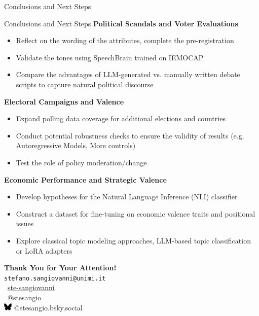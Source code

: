 \documentclass[9pt, aspectratio=169]{beamer}
\newcommand{\customcite}[1]{\textcolor{blue}{\footnotesize\parencite{#1}}}
\begin{document}
\begin{section}{Conclusions and Next Steps}
\begin{frame}{Conclusions and Next Steps}
    \textbf{Political Scandals and Voter Evaluations}
    \begin{itemize}
        \item Reflect on the wording of the attributes, complete the pre-registration
        \item Validate the tones using SpeechBrain \customcite{speechbrain} trained on IEMOCAP
        \item Compare the advantages of LLM-generated vs. manually written debate scripts to capture natural political discourse
    \end{itemize}
    \vspace{0.2cm}
    \textbf{Electoral Campaigns and Valence}
    \begin{itemize}
        \item Expand polling data coverage for additional elections and countries
        \item Conduct potential robustness checks to ensure the validity of results (e.g. Autoregressive Models, More controls)
        \item Test the role of policy moderation/change 
    \end{itemize}
    \vspace{0.2cm}
    \textbf{Economic Performance and Strategic Valence}
    \begin{itemize}
        \item Develop hypotheses for the Natural Language Inference (NLI) classifier
        \item Construct a dataset for fine-tuning on economic valence traits and positional issues
        \item Explore classical topic modeling approaches, LLM-based topic classification or LoRA adapters
    \end{itemize}
    \end{frame}
\end{section}

\begin{frame}[plain]
\centering
\vspace{2cm}
\textbf{\large Thank You for Your Attention!} \\ [0.2cm] 
\texttt{stefano.sangiovanni@unimi.it} \\[3cm]

\faGithub\ \href{https://github.com/ste-sangiovanni}{ste-sangiovanni} \\[0.1cm]
\faTwitter\ @stesangio \\ 
\includegraphics[width=0.03\textwidth]{images/Bluesky_logo_(black).svg.png} @stesangio.bsky.social
\vspace{0.2cm}
\end{frame}
\end{document}
